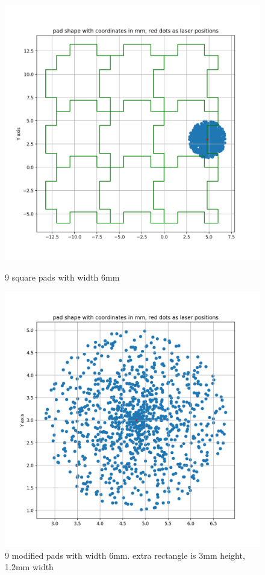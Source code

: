 \documentclass{article}
\begin{document}
\begin{figure}
  \centering
  \begin{minipage}[b]{0.4\textwidth}
    \includegraphics[width=\textwidth]{fig3_a.png}
    \caption{9 square pads with width 6mm}
  \end{minipage}
  \hfill
  \begin{minipage}[b]{0.4\textwidth}
    \includegraphics[width=\textwidth]{fig3_b.png}
    \caption{9 modified pads with width 6mm. extra rectangle is 3mm height, 1.2mm width}
  \end{minipage}
\end{figure}
\end{document}
